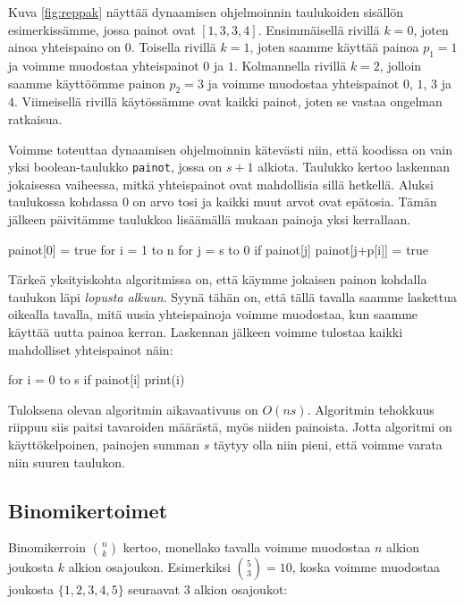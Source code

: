 Kuva \ref{fig:reppak} näyttää dynaamisen ohjelmoinnin
taulukoiden sisällön esimerkissämme, jossa painot ovat $[1,3,3,4]$.
Ensimmäisellä rivillä $k=0$, joten ainoa yhteispaino on $0$.
Toisella rivillä $k=1$, joten saamme käyttää painoa $p_1=1$
ja voimme muodostaa yhteispainot $0$ ja $1$.
Kolmannella rivillä $k=2$, jolloin saamme käyttöömme painon $p_2=3$
ja voimme muodostaa yhteispainot $0$, $1$, $3$ ja $4$.
Viimeisellä rivillä käytössämme ovat kaikki painot,
joten se vastaa ongelman ratkaisua.

Voimme toteuttaa dynaamisen ohjelmoinnin kätevästi niin,
että koodissa on vain yksi boolean-taulukko \texttt{painot},
jossa on $s+1$ alkiota.
Taulukko kertoo laskennan jokaisessa vaiheessa,
mitkä yhteispainot ovat mahdollisia sillä hetkellä.
Aluksi taulukossa kohdassa $0$ on arvo tosi ja
kaikki muut arvot ovat epätosia.
Tämän jälkeen päivitämme taulukkoa lisäämällä mukaan
painoja yksi kerrallaan.

\begin{code}
painot[0] = true
for i = 1 to n
    for j = s to 0
        if painot[j]
            painot[j+p[i]] = true
\end{code}

Tärkeä yksityiskohta algoritmissa on,
että käymme jokaisen painon kohdalla taulukon
läpi \emph{lopusta alkuun}.
Syynä tähän on, että tällä tavalla saamme
laskettua oikealla tavalla, mitä uusia yhteispainoja
voimme muodostaa, kun saamme käyttää uutta painoa kerran.
Laskennan jälkeen voimme tulostaa kaikki
mahdolliset yhteispainot näin:

\begin{code}
for i = 0 to s
    if painot[i]
        print(i)
\end{code}

Tuloksena olevan algoritmin aikavaativuus on $O(ns)$.
Algoritmin tehokkuus riippuu siis paitsi tavaroiden määrästä,
myös niiden painoista.
Jotta algoritmi on käyttökelpoinen, painojen summan $s$
täytyy olla niin pieni, että voimme varata niin suuren taulukon.

\subsection{Binomikertoimet}


Binomikerroin $\binom{n}{k}$ kertoo, monellako tavalla voimme
muodostaa $n$ alkion joukosta $k$ alkion osajoukon.
Esimerkiksi $\binom{5}{3}=10$, koska voimme muodostaa
joukosta $\{1,2,3,4,5\}$ seuraavat 3 alkion osajoukot:

